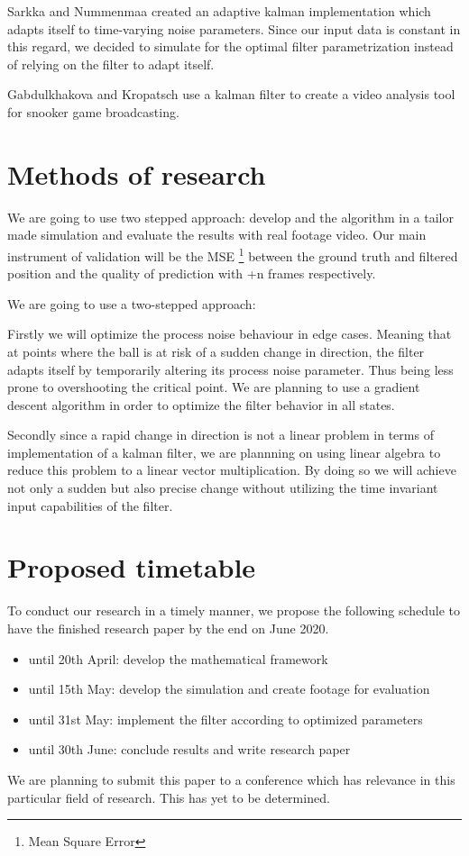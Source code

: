\documentclass[titlepage, a4paper, 11pt]{scrartcl}
\begin{document}
\begin{multicols}{2}
    Sarkka and Nummenmaa \cite{sarkka} created an adaptive kalman implementation which adapts itself to time-varying noise parameters. Since our input data is constant in this regard,
    we decided to simulate for the optimal filter parametrization instead of relying on the filter to adapt itself.

    Gabdulkhakova and Kropatsch \cite{kropatsch} use a kalman filter to create a video analysis tool for snooker game broadcasting.

    \section{Methods of research}

    We are going to use two stepped approach: develop and the algorithm in a tailor made simulation
    and evaluate the results with real footage video. Our main instrument of validation will be the MSE
    \footnote{Mean Square Error} between the ground truth and filtered position and the quality of prediction
    with +n frames respectively.

    We are going to use a two-stepped approach: 
    
    Firstly we will optimize the process noise behaviour in edge cases. 
    Meaning that at points where the ball is at risk of a sudden change in direction, the filter adapts itself by temporarily altering its process noise parameter.
    Thus being less prone to overshooting the critical point.
    We are planning to use a gradient descent algorithm in order to optimize the filter behavior in all states.

    Secondly since a rapid change in direction is not a linear problem in terms of implementation of a kalman filter, we are plannning on using linear algebra to reduce this problem 
    to a linear vector multiplication. By doing so we will achieve not only a sudden but also precise change without utilizing the time invariant input capabilities of the filter.

    \section{Proposed timetable}

    To conduct our research in a timely manner, we propose the following schedule to have the finished research paper by the end on June 2020.

    \begin{itemize}
        \item until 20th April: develop the mathematical framework
        \item until 15th May: develop the simulation and create footage for evaluation
        \item until 31st May: implement the filter according to optimized parameters
        \item until 30th June: conclude results and write research paper
    \end{itemize}

    We are planning to submit this paper to a conference which has relevance in this particular field of research. This has yet to be determined.

\end{multicols} 

 

\end{document}
